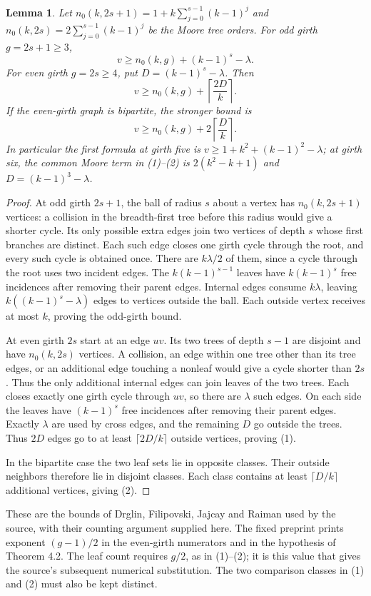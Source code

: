 \documentclass[11pt,a4paper]{article}
\newtheorem{lemma}[theorem]{Lemma}
\begin{document}
\begin{lemma}\label{bounds}
Let $n_0(k,2s+1)=1+k\sum_{j=0}^{s-1}(k-1)^j$ and
$n_0(k,2s)=2\sum_{j=0}^{s-1}(k-1)^j$ be the Moore tree orders.
For odd girth $g=2s+1\geq3$,
\[
 v\geq n_0(k,g)+(k-1)^s-\lambda.
\]
For even girth $g=2s\geq4$, put $D=(k-1)^s-\lambda$. Then
\[
 v\geq n_0(k,g)+\left\lceil\frac{2D}{k}\right\rceil.       \tag{1}
\]
If the even-girth graph is bipartite, the stronger bound is
\[
 v\geq n_0(k,g)+2\left\lceil\frac{D}{k}\right\rceil.        \tag{2}
\]
In particular the first formula at girth five is
$v\geq1+k^2+(k-1)^2-\lambda$; at girth six, the common
Moore term in (1)--(2) is $2(k^2-k+1)$ and $D=(k-1)^3-\lambda$.
\end{lemma}
\begin{proof}
At odd girth $2s+1$, the ball of radius $s$ about a vertex has
$n_0(k,2s+1)$ vertices: a collision in the breadth-first tree before
this radius would give a shorter cycle. Its only possible extra edges
join two vertices of depth $s$ whose first branches are distinct.
Each such edge closes one girth cycle through the root, and every
such cycle is obtained once. There are $k\lambda/2$ of them, since
a cycle through the root uses two incident edges. The $k(k-1)^{s-1}$
leaves have $k(k-1)^s$ free incidences after removing their parent
edges. Internal edges consume $k\lambda$, leaving
$k((k-1)^s-\lambda)$ edges to vertices outside the ball. Each outside
vertex receives at most $k$, proving the odd-girth bound.

At even girth $2s$ start at an edge $uv$. Its two trees of depth
$s-1$ are disjoint and have $n_0(k,2s)$ vertices. A collision,
an edge within one tree other than its tree edges, or an additional
edge touching a nonleaf would give a cycle shorter than $2s$.
Thus the only additional internal edges can join leaves of the two
trees. Each closes exactly one girth cycle through $uv$, so there
are $\lambda$ such edges. On each side the leaves have $(k-1)^s$
free incidences after removing their parent edges. Exactly $\lambda$
are used by cross edges, and the remaining $D$ go outside the trees.
Thus $2D$ edges go to at least $\lceil2D/k\rceil$ outside vertices,
proving (1).

In the bipartite case the two leaf sets lie in opposite classes.
Their outside neighbors therefore lie in disjoint classes. Each
class contains at least $\lceil D/k\rceil$ additional vertices,
giving (2).
\end{proof}
These are the bounds of Drglin, Filipovski, Jajcay and Raiman
used by the source, with their counting argument supplied here.
The fixed preprint prints exponent $(g-1)/2$ in the even-girth
numerators and in the hypothesis of Theorem 4.2. The leaf count
requires $g/2$, as in (1)--(2); it is this value that gives the
source's subsequent numerical substitution. The two comparison
classes in (1) and (2) must also be kept distinct.
\end{document}
